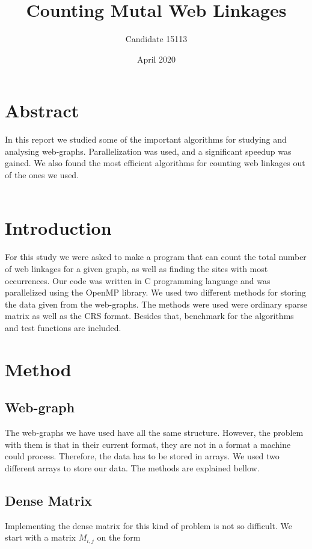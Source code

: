 \documentclass{article}
\title{Counting Mutal Web Linkages}
\author{

  Candidate 15113\\

}
\date{April 2020}
\begin{document}
\maketitle

\section{Abstract}
In this report we studied some of the important algorithms for studying and analysing web-graphs. Parallelization was used, and a significant speedup was gained. We also found the most efficient algorithms for counting web linkages out of the ones we used.\\\\
\tableofcontents
\newpage
\section{Introduction}
For this study we were asked to make a program that can count the total number of web linkages for a given graph, as well as finding the sites with most occurrences. Our code was written in C programming language and was parallelized using the OpenMP library. We used two different methods for storing the data given from the web-graphs. The methods were used were ordinary sparse matrix as well as the CRS format\citep{book1}. Besides that, benchmark for the algorithms and test functions are included.

\section{Method}

\subsection{Web-graph}
The web-graphs we have used have all the same structure. However, the problem with them is that in their current format, they are not in a format a machine could process. Therefore, the data has to be stored in arrays. We used two different arrays to store our data. The methods are explained bellow. 


\subsection{Dense Matrix}

Implementing the dense matrix for this kind of problem is not so difficult. We start with a matrix $M_{i,j}$ on the form
\end{document}
